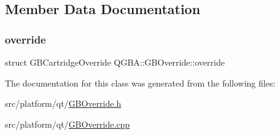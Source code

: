 \subsection{Member Data Documentation}
\mbox{\label{class_q_g_b_a_1_1_g_b_override_aa3a3f70ba43a85f93c3e6fc210595940}} 
\subsubsection{\texorpdfstring{override}{override}}
{\footnotesize\ttfamily struct G\+B\+Cartridge\+Override Q\+G\+B\+A\+::\+G\+B\+Override\+::override}



The documentation for this class was generated from the following files\+:\begin{DoxyCompactItemize}
\item 
src/platform/qt/\mbox{\hyperlink{_g_b_override_8h}{G\+B\+Override.\+h}}\item 
src/platform/qt/\mbox{\hyperlink{_g_b_override_8cpp}{G\+B\+Override.\+cpp}}\end{DoxyCompactItemize}
